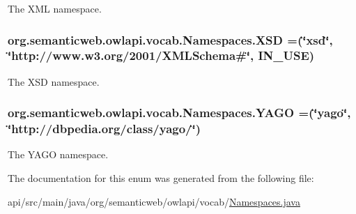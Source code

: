 The X\-M\-L namespace. \hypertarget{enumorg_1_1semanticweb_1_1owlapi_1_1vocab_1_1_namespaces_ad23159b4298d8448c5af25510c8c7f13}{
\subsubsection[{X\-S\-D}]{\setlength{\rightskip}{0pt plus 5cm}org.\-semanticweb.\-owlapi.\-vocab.\-Namespaces.\-X\-S\-D =(\char`\"{}xsd\char`\"{}, \char`\"{}http\-://www.\-w3.\-org/2001/X\-M\-L\-Schema\#\char`\"{}, I\-N\-\_\-\-U\-S\-E)}}\label{enumorg_1_1semanticweb_1_1owlapi_1_1vocab_1_1_namespaces_ad23159b4298d8448c5af25510c8c7f13}
The X\-S\-D namespace. \hypertarget{enumorg_1_1semanticweb_1_1owlapi_1_1vocab_1_1_namespaces_af6e6ce07a4b43e2529b00a98b5417179}{
\subsubsection[{Y\-A\-G\-O}]{\setlength{\rightskip}{0pt plus 5cm}org.\-semanticweb.\-owlapi.\-vocab.\-Namespaces.\-Y\-A\-G\-O =(\char`\"{}yago\char`\"{}, \char`\"{}http\-://dbpedia.\-org/class/yago/\char`\"{})}}\label{enumorg_1_1semanticweb_1_1owlapi_1_1vocab_1_1_namespaces_af6e6ce07a4b43e2529b00a98b5417179}
The Y\-A\-G\-O namespace. 

The documentation for this enum was generated from the following file\-:\begin{DoxyCompactItemize}
\item 
api/src/main/java/org/semanticweb/owlapi/vocab/\hyperlink{_namespaces_8java}{Namespaces.\-java}\end{DoxyCompactItemize}
